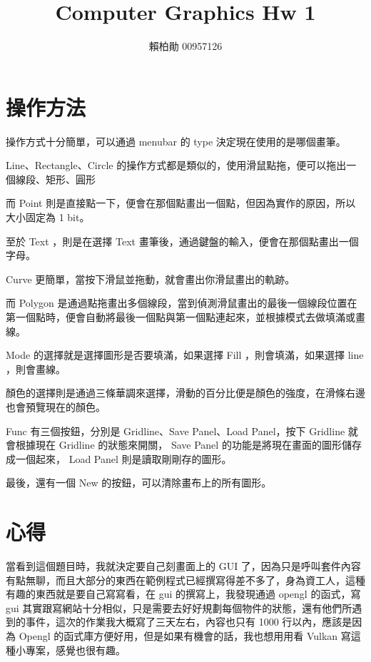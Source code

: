 \documentclass[a4,12pt]{article}
\title{Computer Graphics Hw 1}
\author{賴柏勛 00957126}
\begin{document}
    \maketitle
    \section{操作方法}
    

    操作方式十分簡單，可以通過 menubar 的 type 決定現在使用的是哪個畫筆。
    
    Line、Rectangle、Circle 的操作方式都是類似的，使用滑鼠點拖，便可以拖出一個線段、矩形、圓形

    而 Point 則是直接點一下，便會在那個點畫出一個點，但因為實作的原因，所以大小固定為 1 bit。

    至於 Text ，則是在選擇 Text 畫筆後，通過鍵盤的輸入，便會在那個點畫出一個字母。

    Curve 更簡單，當按下滑鼠並拖動，就會畫出你滑鼠畫出的軌跡。

    而 Polygon 是通過點拖畫出多個線段，當到偵測滑鼠畫出的最後一個線段位置在第一個點時，便會自動將最後一個點與第一個點連起來，並根據模式去做填滿或畫線。

    Mode 的選擇就是選擇圖形是否要填滿，如果選擇 Fill ，則會填滿，如果選擇 line ，則會畫線。

    顏色的選擇則是通過三條華調來選擇，滑動的百分比便是顏色的強度，在滑條右邊也會預覽現在的顏色。
    
    Func 有三個按鈕，分別是 Gridline、Save Panel、Load Panel，按下 Gridline 就會根據現在 Gridline 的狀態來開關， Save Panel 的功能是將現在畫面的圖形儲存成一個起來， Load Panel 則是讀取剛剛存的圖形。
    
    最後，還有一個 New 的按鈕，可以清除畫布上的所有圖形。
    \section{心得}
    當看到這個題目時，我就決定要自己刻畫面上的 GUI 了，因為只是呼叫套件內容有點無聊，而且大部分的東西在範例程式已經撰寫得差不多了，身為資工人，這種有趣的東西就是要自己寫寫看，在 gui 的撰寫上，我發現通過 opengl 的函式，寫 gui 其實跟寫網站十分相似，只是需要去好好規劃每個物件的狀態，還有他們所遇到的事件，這次的作業我大概寫了三天左右，內容也只有 1000 行以內，應該是因為 Opengl 的函式庫方便好用，但是如果有機會的話，我也想用用看 Vulkan 寫這種小專案，感覺也很有趣。
\end{document}
